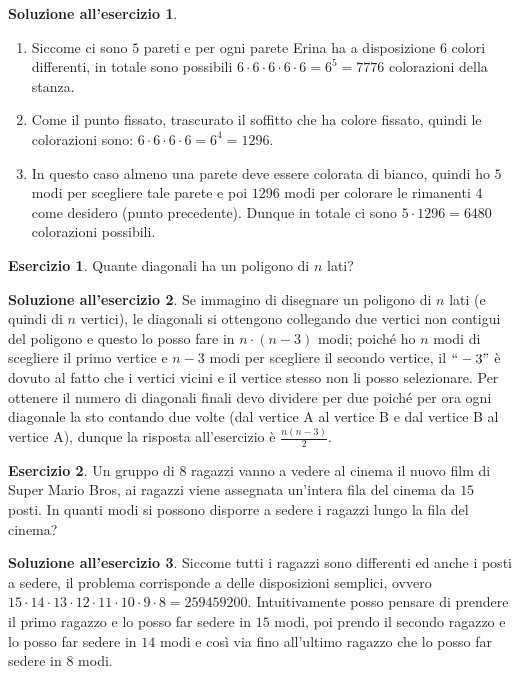 \documentclass[12pt,a4paper]{article}
\theoremstyle{definition}
\newtheorem{sol}{Soluzione all'esercizio}
\newtheorem{exe}{Esercizio}
\begin{document}
\begin{sol}\mbox{}\vspace{-0.7cm}\\
	\begin{enumerate}
		\item Siccome ci sono $ 5 $ pareti e per ogni parete Erina ha a disposizione $ 6 $ colori differenti, in totale sono possibili $ 6\cdot 6\cdot6 \cdot 6\cdot6 = 6^5 =7776$ colorazioni della stanza.
		\item Come il punto fissato, trascurato il soffitto che ha colore fissato, quindi le colorazioni sono:  $ 6\cdot 6\cdot6 \cdot 6 = 6^4 = 1296. $
		\item In questo caso almeno una parete deve essere colorata di bianco, quindi ho $ 5 $ modi per scegliere tale parete e poi $ 1296 $ modi per colorare le rimanenti $ 4 $ come desidero (punto precedente). Dunque in totale ci sono $ 5 \cdot 1296 = 6480 $ colorazioni possibili.
	\end{enumerate}
\end{sol}

\begin{exe}
	Quante diagonali ha un poligono di $ n $ lati?
\end{exe}

\begin{sol}
	Se immagino di disegnare un poligono di $ n $ lati (e quindi di $ n $ vertici), le diagonali si ottengono collegando due vertici non contigui del poligono e questo lo posso fare in $ n\cdot(n-3) $ modi; poiché ho $ n $ modi di scegliere il primo vertice e $ n-3 $ modi per scegliere il secondo vertice, il $`` -3" $ è dovuto al fatto che i vertici vicini e il vertice stesso non li posso selezionare. Per ottenere il numero di diagonali finali devo dividere per due poiché per ora ogni diagonale la sto contando due volte (dal vertice A al vertice B e dal vertice B al vertice A), dunque la risposta all'esercizio è $ \frac{n(n-3)}{2}. $
\end{sol}

\begin{exe}
	Un gruppo di $ 8 $ ragazzi vanno a vedere al cinema il nuovo film di Super Mario Bros, ai ragazzi viene assegnata un'intera fila del cinema da $ 15 $ posti. In quanti modi si possono disporre a sedere i ragazzi lungo la fila del cinema?
\end{exe}

\begin{sol}
	Siccome tutti i ragazzi sono differenti ed anche i posti a sedere, il problema corrisponde a delle disposizioni semplici, ovvero $ 15\cdot14\cdot13\cdot12\cdot11\cdot10\cdot9\cdot8 = 259459200.$ Intuitivamente posso pensare di prendere il primo ragazzo e lo posso far sedere in $ 15 $ modi, poi prendo il secondo ragazzo e lo posso far sedere in $ 14 $ modi e così via fino all'ultimo ragazzo che lo posso far sedere in $ 8 $ modi.
\end{sol}
\end{document}
